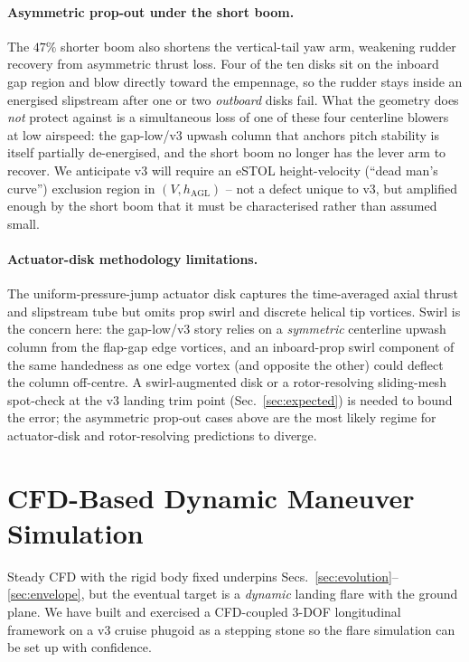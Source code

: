 \documentclass[conf]{new-aiaa}
\begin{document}
\paragraph{Asymmetric prop-out under the short boom.}
The $47\%$ shorter boom also shortens the vertical-tail yaw
arm, weakening rudder recovery from asymmetric thrust loss.
Four of the ten disks sit on the inboard gap region and blow
directly toward the empennage, so the rudder stays inside an
energised slipstream after one or two \emph{outboard} disks
fail.  What the geometry does \emph{not} protect against is a
simultaneous loss of one of these four centerline blowers at
low airspeed: the gap-low/v3 upwash column that anchors pitch
stability is itself partially de-energised, and the short boom
no longer has the lever arm to recover.  We anticipate v3
will require an eSTOL height-velocity (``dead man's curve'')
exclusion region in $(V, h_{\mathrm{AGL}})$ -- not a defect
unique to v3, but amplified enough by the short boom that it
must be characterised rather than assumed small.

\paragraph{Actuator-disk methodology limitations.}
The uniform-pressure-jump actuator disk captures the
time-averaged axial thrust and slipstream tube but omits prop
swirl and discrete helical tip vortices.  Swirl is the concern
here: the gap-low/v3 story relies on a \emph{symmetric}
centerline upwash column from the flap-gap edge vortices, and
an inboard-prop swirl component of the same handedness as one
edge vortex (and opposite the other) could deflect the column
off-centre.  A swirl-augmented disk or a rotor-resolving
sliding-mesh spot-check at the v3 landing trim point
(Sec.~\ref{sec:expected}) is needed to bound the error; the
asymmetric prop-out cases above are the most likely regime for
actuator-disk and rotor-resolving predictions to diverge.

\section{CFD-Based Dynamic Maneuver Simulation}
\label{sec:dynamic}

Steady CFD with the rigid body fixed underpins
Secs.~\ref{sec:evolution}--\ref{sec:envelope}, but the eventual
target is a \emph{dynamic} landing flare with the ground plane.
We have built and exercised a CFD-coupled 3-DOF longitudinal
framework on a v3 cruise phugoid as a stepping stone so the
flare simulation can be set up with confidence.
\end{document}
